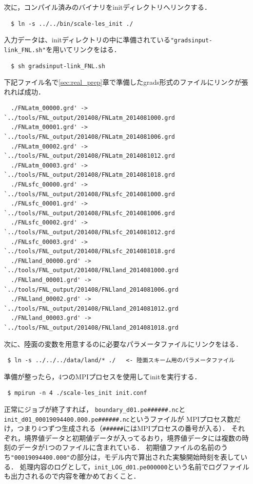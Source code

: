 次に，コンパイル済みのバイナリをinitディレクトリへリンクする．
\begin{verbatim}
  $ ln -s ../../bin/scale-les_init ./
\end{verbatim}
入力データは、initディレクトリの中に準備されている\verb|"gradsinput-link_FNL.sh"|を用いてリンクをはる．
\begin{verbatim}
  $ sh gradsinput-link_FNL.sh
\end{verbatim}
下記ファイル名で\ref{sec:real_prep}章で準備したgrads形式のファイルにリンクが張れれば成功．
{\small
\begin{verbatim}
  ./FNLatm_00000.grd' -> `../tools/FNL_output/201408/FNLatm_2014081000.grd
  ./FNLatm_00001.grd' -> `../tools/FNL_output/201408/FNLatm_2014081006.grd
  ./FNLatm_00002.grd' -> `../tools/FNL_output/201408/FNLatm_2014081012.grd
  ./FNLatm_00003.grd' -> `../tools/FNL_output/201408/FNLatm_2014081018.grd
  ./FNLsfc_00000.grd' -> `../tools/FNL_output/201408/FNLsfc_2014081000.grd
  ./FNLsfc_00001.grd' -> `../tools/FNL_output/201408/FNLsfc_2014081006.grd
  ./FNLsfc_00002.grd' -> `../tools/FNL_output/201408/FNLsfc_2014081012.grd
  ./FNLsfc_00003.grd' -> `../tools/FNL_output/201408/FNLsfc_2014081018.grd
  ./FNLland_00000.grd' -> `../tools/FNL_output/201408/FNLland_2014081000.grd
  ./FNLland_00001.grd' -> `../tools/FNL_output/201408/FNLland_2014081006.grd
  ./FNLland_00002.grd' -> `../tools/FNL_output/201408/FNLland_2014081012.grd
  ./FNLland_00003.grd' -> `../tools/FNL_output/201408/FNLland_2014081018.grd
\end{verbatim} }

次に、陸面の変数を用意するのに必要なパラメータファイルにリンクをはる．
\begin{verbatim}
 $ ln -s ../../../data/land/* ./   <- 陸面スキーム用のパラメータファイル
\end{verbatim}
準備が整ったら，4つのMPIプロセスを使用してinitを実行する．
\begin{verbatim}
 $ mpirun -n 4 ./scale-les_init init.conf
\end{verbatim}

正常にジョブが終了すれば，
\verb|boundary_d01.pe######.nc|と\verb|init_d01_00019094400.000.pe######.nc|というファイルが
MPIプロセス数だけ，つまり4つずつ生成される（\verb|######|にはMPIプロセスの番号が入る）．
それぞれ，境界値データと初期値データが入ってるおり，境界値データには複数の時刻のデータが1つのファイルに含まれている．
初期値ファイルの名前のうち\verb|"00019094400.000"|の部分は，モデル内で算出された実験開始時刻を表している．
処理内容のログとして，\verb|init_LOG_d01.pe000000|という名前でログファイルも出力されるので内容を確かめておくこと．


